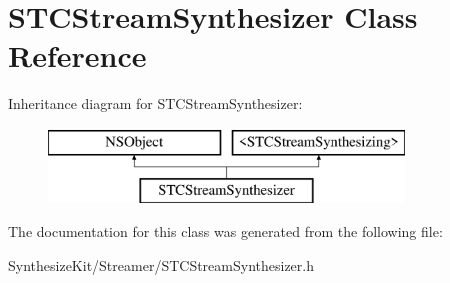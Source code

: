 \hypertarget{interface_s_t_c_stream_synthesizer}{}\section{S\+T\+C\+Stream\+Synthesizer Class Reference}
\label{interface_s_t_c_stream_synthesizer}
Inheritance diagram for S\+T\+C\+Stream\+Synthesizer\+:\begin{figure}[H]
\begin{center}
\leavevmode
\includegraphics[height=2.000000cm]{interface_s_t_c_stream_synthesizer}
\end{center}
\end{figure}


The documentation for this class was generated from the following file\+:\begin{DoxyCompactItemize}
\item 
Synthesize\+Kit/\+Streamer/S\+T\+C\+Stream\+Synthesizer.\+h\end{DoxyCompactItemize}
